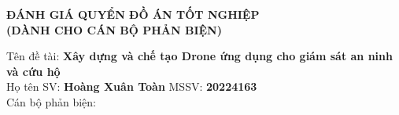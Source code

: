 \normalfont
\thispagestyle{empty}
\begin{center}
    \textbf{\fontsize{14pt}{16pt}\selectfont ĐÁNH GIÁ QUYỂN ĐỒ ÁN TỐT NGHIỆP}\\
    \textbf{\fontsize{12pt}{14pt}\selectfont (DÀNH CHO CÁN BỘ PHẢN BIỆN)}
\end{center}

\vspace{10pt}
\noindent Tên đề tài: \textbf{Xây dựng và chế tạo Drone ứng dụng cho giám sát an ninh và cứu hộ} \\[8pt]
\noindent Họ tên SV: \textbf{Hoàng Xuân Toàn} \hspace{3.5cm} MSSV: \textbf{20224163} \\[8pt]
\noindent Cán bộ phản biện: \dotfill

\vspace{10pt}
